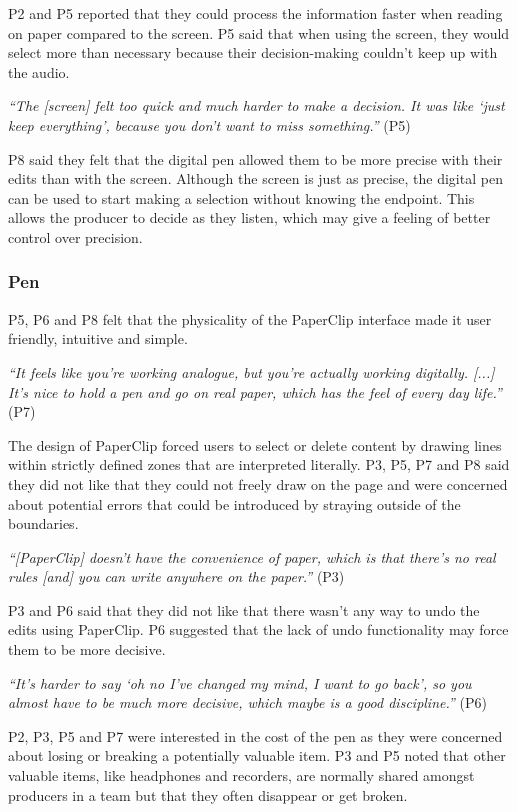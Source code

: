 P2 and P5 reported that they could process the information faster when reading on paper compared to the screen. P5 said
that when using the screen, they would select more than necessary because their decision-making couldn't keep up with
the audio.


\textit{``The [screen] felt too quick and much harder to make a decision. It was like
  `just keep everything', because you don't want to miss something.''} (P5)

P8 said they felt that the digital pen allowed them to be more precise with their edits than with the screen.  Although
the screen is just as precise, the digital pen can be used to start making a selection without knowing the endpoint.
This allows the producer to decide as they listen, which may give a feeling of better control over precision.



\subsubsection{Pen}

P5, P6 and P8 felt that the physicality of the PaperClip interface made it user friendly, intuitive and simple.

\textit{``It feels like you're working analogue, but you're actually working digitally. [...] It's nice to hold a pen
and go on real paper, which has the feel of every day life.''} (P7)

The design of PaperClip forced users to select or delete content by drawing lines within strictly defined zones
that are interpreted literally. P3, P5, P7 and P8 said they did not like that they could not freely draw on the page and were
concerned about potential errors that could be introduced by straying outside of the boundaries.

\textit{``[PaperClip] doesn't have the convenience of paper, which is that there's no real rules [and] you can
write anywhere on the paper.''} (P3)




P3 and P6 said that they did not like that there wasn't any way to undo the edits using PaperClip. P6 suggested
that the lack of undo functionality may force them to be more decisive.

\textit{``It's harder to say `oh no I've changed my mind, I want to go back', so you almost have to be much more
decisive, which maybe is a good discipline.''} (P6)


P2, P3, P5 and P7 were interested in the cost of the pen as they were concerned about losing or breaking a potentially
valuable item.  P3 and P5 noted that other valuable items, like headphones and recorders, are normally shared amongst
producers in a team but that they often disappear or get broken.


